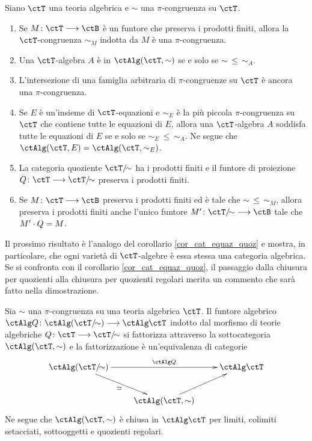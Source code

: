 \begin{proposition}\label{prop_recap_cong_alg}
 Siano \(\ctT\) una teoria algebrica e \(\sim\) una \(\pi\)-congruenza su \(\ctT\).
 \begin{enumerate}
  \item Se \(M \colon \ctT \fun \ctB\) è un funtore che preserva i prodotti finiti, allora la \(\ctT\)-congruenza \(\sim_M\) indotta
        da \(M\) è una \(\pi\)-congruenza.
  \item Una \(\ctT\)-algebra \(A\) è in \(\ctAlg(\ctT,\sim)\) se e solo se \(\sim \,\leq\, \sim_A\).
  \item L'intersezione di una famiglia arbitraria di \(\pi\)-congruenze su \(\ctT\) è ancora una \(\pi\)-congruenza.
  \item Se \(E\) è un'insieme di \(\ctT\)-equazioni e \(\sim_E\) è la più piccola \(\pi\)-congruenza su \(\ctT\) che contiene tutte
        le equazioni di \(E\), allora una \(\ctT\)-algebra \(A\) soddisfa tutte le equazioni di \(E\) se e solo se \(\sim_E \,\leq\, \sim_A\).
        Ne segue che \(\ctAlg(\ctT,E) = \ctAlg(\ctT,\sim_E)\).
  \item La categoria quoziente \(\ctT/{\!\sim}\) ha i prodotti finiti e il funtore di proiezione \(Q \colon \ctT \fun \ctT/{\!\sim}\)
        preserva i prodotti finiti.
  \item Se \(M \colon \ctT \fun \ctB\) preserva i prodotti finiti ed è tale che \(\sim \,\leq\, \sim_M\), allora preserva i prodotti finiti
        anche l'unico funtore \(M' \colon \ctT/{\!\sim} \fun \ctB\) tale che \(M' \cdot Q = M\).
 \end{enumerate}
\end{proposition}

Il prossimo risultato è l'analogo del corollario \ref{cor_cat_equaz_quoz} e mostra, in particolare, che ogni varietà di
\(\ctT\)-algebre è essa stessa una categoria algebrica. Se si confronta con il corollario \ref{cor_cat_equaz_quoz}, il
passaggio dalla chiusura per quozienti alla chiusura per quozienti regolari merita un commento che sarà fatto nella dimostrazione.

\begin{proposition}\label{prop_var_equaz_quoz}
 Sia \(\sim\) una \(\pi\)-congruenza su una teoria algebrica \(\ctT\). Il funtore algebrico \(\ctAlg Q \colon \ctAlg(\ctT/{\!\sim}) \fun \ctAlg\ctT\)
 indotto dal morfismo di teorie algebriche \(Q \colon \ctT \fun \ctT/{\!\sim}\) si fattorizza attraverso la sottocategoria \(\ctAlg(\ctT,\sim)\)
 e la fattorizzazione è un'equivalenza di categorie
 \[\xymatrix{\ctAlg(\ctT/{\!\sim}) \ar[rr]^-{\ctAlg Q} \ar[rd]_{\simeq} & & \ctAlg\ctT \\
  & \ctAlg(\ctT,\sim) \ar[ru] }\]
 Ne segue che \(\ctAlg(\ctT,\sim)\) è chiusa in \(\ctAlg\ctT\) per limiti, colimiti setacciati, sottooggetti e quozienti regolari.
\end{proposition}

